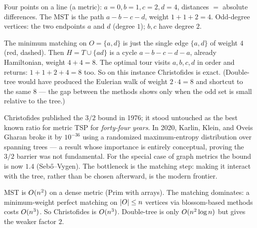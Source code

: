 \begin{labbox}
Four points on a line (a metric): $a=0, b=1, c=2, d=4$, distances $=$ absolute differences. The MST is
the path $a\!-\!b\!-\!c\!-\!d$, weight $1+1+2=4$. Odd-degree vertices: the two endpoints $a$ and $d$
(degree $1$); $b,c$ have degree $2$.

\begin{center}
\end{center}

The minimum matching on $O=\{a,d\}$ is just the single edge $\{a,d\}$ of weight $4$ (red, dashed).
Then $H = T\cup\{ad\}$ is a cycle $a\!-\!b\!-\!c\!-\!d\!-\!a$, already Hamiltonian, weight
$4+4=8$. The optimal tour visits $a,b,c,d$ in order and returns: $1+1+2+4=8$ too. So on this instance
Christofides is exact. (Double-tree would have produced the Eulerian walk of weight $2\cdot4=8$ and
shortcut to the same $8$ --- the gap between the methods shows only when the odd set is small relative
to the tree.)
\end{labbox}

\begin{historybox}
Christofides published the $3/2$ bound in 1976; it stood untouched as the best known ratio for metric
TSP for \emph{forty-four years}. In 2020, Karlin, Klein, and Oveis Gharan broke it by
$10^{-36}$ using a randomized maximum-entropy distribution over spanning trees --- a result whose
importance is entirely conceptual, proving the $3/2$ barrier was not fundamental. For the special
case of graph metrics the bound is now $1.4$ (Seb\H{o}--Vygen). The bottleneck is the matching step:
making it interact with the tree, rather than be chosen afterward, is the modern frontier.
\end{historybox}

\begin{complexitybox}
MST is $O(n^2)$ on a dense metric (Prim with arrays). The matching dominates: a minimum-weight
perfect matching on $\lvert O\rvert\le n$ vertices via blossom-based methods costs $O(n^3)$. So
Christofides is $O(n^3)$. Double-tree is only $O(n^2\log n)$ but gives the weaker factor $2$.
\end{complexitybox}

